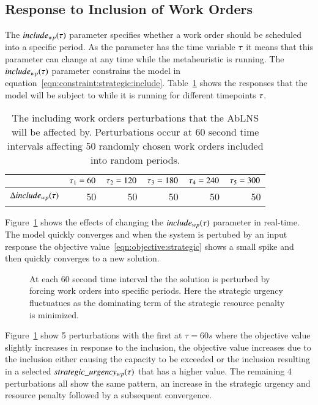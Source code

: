 \subsection{Response to Inclusion of Work Orders}\label{sec:response_work_orders}
The $include_{wp}(\tau)$ parameter specifies whether a work order
should be scheduled into a specific period. As the parameter has the time
variable $\tau$ it means that this parameter can change at any time
while the metaheuristic is running. The $include_{wp}(\tau)$ parameter
constrains the model in equation~\ref{eqn:constraint:strategic:include}.
Table~\ref{tab:responses:inclusion} shows the responses that the model will be
subject to while it is running for different timepoints $\tau$.

\begin{table}[H]
	\centering
	\begin{tabular}{lrrrrr}
	\toprule
	                                & $\tau_1 = 60$ & $\tau_2 = 120$ & $\tau_3 = 180$ & $\tau_4 = 240$ & $\tau_5 = 300$ \\ \midrule
	$\Delta include_{wp}(\tau)$ & 50                    & 50                     & 50                     & 50                     & 50                     \\ \bottomrule
	\end{tabular}
	\caption{The including work orders perturbations that the AbLNS will be affected by. 
		Perturbations occur at 60 second time intervals affecting 50 randomly chosen work orders included into random periods.
	}\label{tab:responses:inclusion}
\end{table}

Figure~\ref{fig:responses:inclusion} shows the effects of changing the $
include_{wp}(\tau)$ parameter in real-time. The model quickly converges
and when the system is pertubed by an input response the objective 
value~\ref{eqn:objective:strategic} shows a small spike and then quickly converges to
a new solution.

\begin{figure}[H]
	\centering
	\resizebox{10cm}{!}{
		
	}
	\caption{At each 60 second time interval the the solution is perturbed by forcing work orders into specific
		periods. Here the strategic urgency fluctuatues as the dominating term of the strategic resource penalty
		is minimized.
	}\label{fig:responses:inclusion}
\end{figure}
Figure~\ref{fig:responses:inclusion}  show 5 perturbations with the first
at $\tau = 60s$ where the objective value slightly increases in response to
the inclusion, the objective value increases due to the inclusion either
causing the capacity to be exceeded or the inclusion resulting in a selected
$ strategic\_urgency_{w p}(\tau)$ that has a higher value. The remaining 4 perturbations
all show the same  pattern, an increase in the strategic urgency and
resource penalty  followed by a subsequent convergence.

